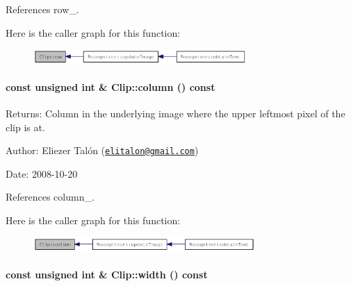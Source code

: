 References row\_\-.

Here is the caller graph for this function:\nopagebreak
\begin{figure}[H]
\begin{center}
\leavevmode
\includegraphics[width=230pt]{class_clip_1a1d1fd626d1325f0f2b9184de4c89b8_icgraph}
\end{center}
\end{figure}
\hypertarget{class_clip_06a34378fa0f23425d10bb04e9972a26}{
\paragraph[column]{\setlength{\rightskip}{0pt plus 5cm}const unsigned int \& Clip::column () const}\hfill}
\label{class_clip_06a34378fa0f23425d10bb04e9972a26}


\begin{Desc}
\item[Returns:]Column in the underlying image where the upper leftmost pixel of the clip is at.\end{Desc}
\begin{Desc}
\item[Author:]Eliezer Talón (\href{mailto:elitalon@gmail.com}{\tt elitalon@gmail.com}) \end{Desc}
\begin{Desc}
\item[Date:]2008-10-20 \end{Desc}


References column\_\-.

Here is the caller graph for this function:\nopagebreak
\begin{figure}[H]
\begin{center}
\leavevmode
\includegraphics[width=239pt]{class_clip_06a34378fa0f23425d10bb04e9972a26_icgraph}
\end{center}
\end{figure}
\hypertarget{class_clip_88d1a47c0ec077e8c6680785509389b0}{
\paragraph[width]{\setlength{\rightskip}{0pt plus 5cm}const unsigned int \& Clip::width () const}\hfill}
\label{class_clip_88d1a47c0ec077e8c6680785509389b0}


